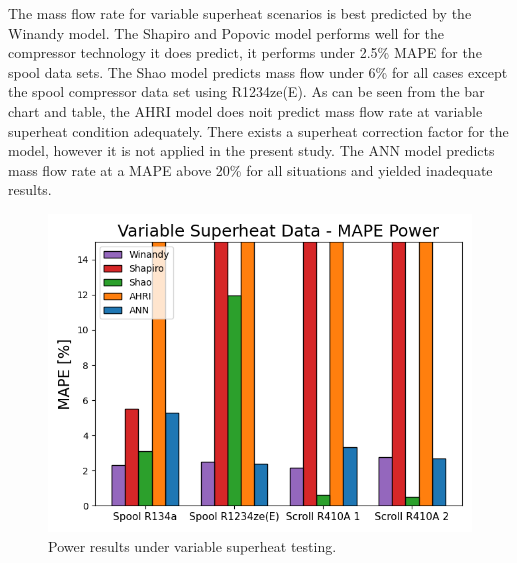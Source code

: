 \documentclass[preprint,11pt,authoryear]{elsarticle}
\begin{document}
\begin{table}[h]
\caption{Mass flow rate results for variable superheat scenarios.}
\label{Tab:vspr_mdot_results}
\begin{center}
\end{center}
\end{table}

The mass flow rate for variable superheat scenarios is best predicted by the Winandy model. The Shapiro and Popovic model performs well for the compressor technology it does predict, it performs under 2.5\% MAPE for the spool data sets. The Shao model predicts mass flow under 6\% for all cases except the spool compressor data set using R1234ze(E). As can be seen from the bar chart and table, the AHRI model does noit predict mass flow rate at variable superheat condition adequately. There exists a superheat correction factor for the model, however it is not applied in the present study. The ANN model predicts mass flow rate at a MAPE above 20\% for all situations and yielded inadequate results.  

\begin{figure}
\centering
\includegraphics[width=0.7\linewidth]{power_vspr.png}
\caption{Power results under variable superheat testing.}
\label{fig:power_vspr}
\end{figure}
\FloatBarrier
\end{document}
